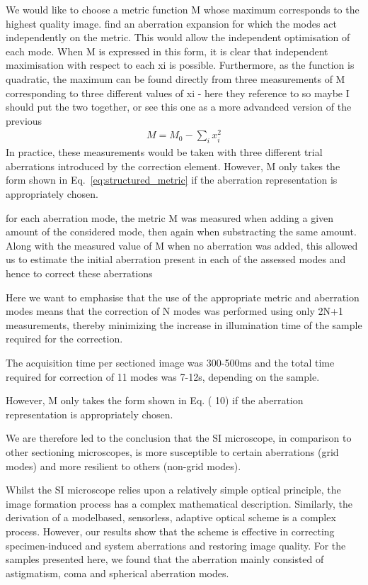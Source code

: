 We would like to choose a metric function M whose maximum corresponds to the highest quality image.
find an aberration expansion for which the modes act independently on the metric.
This would allow the independent optimisation of each mode.
When M is expressed in this form, it is clear that independent maximisation with respect to each xi is possible. Furthermore, as the function is quadratic, the maximum can be found directly from three measurements of M corresponding to three different values of xi - here they reference to \cite{wide_AOM_loew_freq} so maybe I should put the two together, or see this one as a more advandced version of the previous
\begin{align}
	M = M_0 - \sum_i{x_i^2}
	\label{eq:structured_metric}
\end{align}
In practice, these measurements would be taken with three different trial aberrations introduced by the correction element. However, M only takes the form shown in Eq.~\eqref{eq:structured_metric} if the aberration representation is appropriately chosen. 

for each aberration mode, the metric M was measured when adding a given amount of the considered mode, then again when substracting the same amount. Along with the measured value of M when no aberration was added, this allowed us to estimate the initial aberration present in each of the assessed modes and hence to correct these aberrations

Here we want to emphasise that the use of the appropriate metric and aberration modes means that the correction of N modes was performed using only 2N+1 measurements, thereby minimizing the increase in illumination time of the sample required for the correction.

The acquisition time per sectioned image was 300-500ms and the total time required for correction of 11 modes was 7-12s, depending on the sample.


However, M only takes the form shown in Eq. ( 10) if the aberration representation is appropriately chosen.


We are therefore led to the conclusion that the SI microscope, in comparison to other sectioning microscopes, is more susceptible to certain aberrations (grid modes) and more resilient to others (non-grid modes).

Whilst the SI microscope relies upon a relatively simple optical principle, the image formation process has a complex mathematical description. Similarly, the derivation of a modelbased, sensorless, adaptive optical scheme is a complex process. However, our results show that the scheme is effective in correcting specimen-induced and system aberrations and restoring image quality. For the samples presented here, we found that the aberration mainly consisted of astigmatism, coma and spherical aberration modes.


